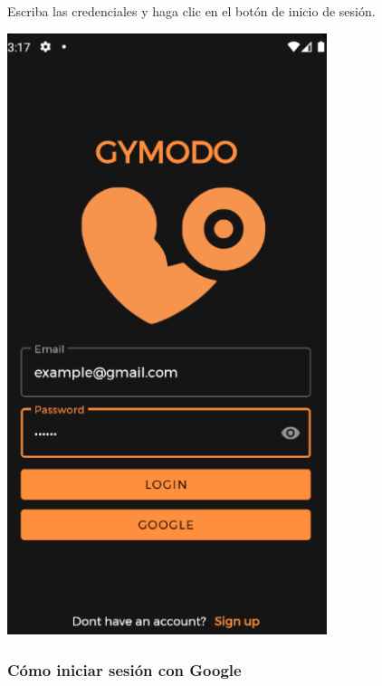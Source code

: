 \documentclass[12pt,a4paper]{article}
\begin{document}
\begin{enumerate}
\begin{minipage}{.60\textwidth}
  \item Escriba las credenciales y haga clic en el botón de inicio de sesión.
\end{minipage}
\begin{minipage}{.40\textwidth}
  \includegraphics[width=0.7\textwidth, right]{loginconcredenciales}
\end{minipage}
\end{enumerate}


\subsubsection{Cómo iniciar sesión con Google}
\end{document}

